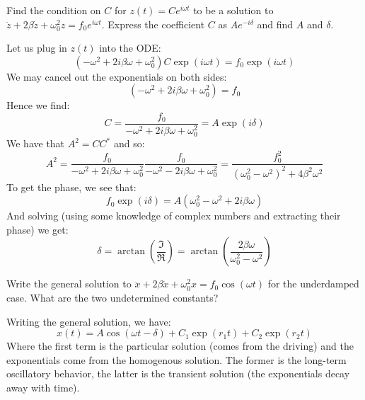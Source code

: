 \documentclass[../PHYS306Notes.tex]{subfiles}
\begin{document}
\begin{p}
Find the condition on $C$ for $z(t) = Ce^{i\omega t}$ to be a solution to $\ddot{z} + 2\beta\dot{z} + \omega_0^2z = f_0e^{i\omega t}$. Express the coefficient $C$ as $Ae^{-i\delta}$ and find $A$ and $\delta$.
\end{p}
\begin{s}
Let us plug in $z(t)$ into the ODE:
\[(-\omega^2 + 2i\beta\omega + \omega_0^2)C\exp(i\omega t) = f_0\exp(i\omega t)\]
We may cancel out the exponentials on both sides:
\[(-\omega^2 + 2i\beta\omega + \omega_0^2) =f_0\]
Hence we find:
\[C = \frac{f_0}{-\omega^2 + 2i\beta\omega + \omega_0^2} = A\exp(i\delta)\]
We have that $A^2 = CC^*$ and so:
\[A^2 = \frac{f_0}{-\omega^2 + 2i\beta\omega + \omega_0^2}\frac{f_0}{-\omega^2 - 2i\beta\omega + \omega_0^2} = \frac{f_0^2}{(\omega_0^2 - \omega^2)^2 + 4\beta^2\omega^2}\]
To get the phase, we see that:
\[f_0\exp(i\delta) = A(\omega_0^2 - \omega^2 + 2i\beta\omega)\]
And solving (using some knowledge of complex numbers and extracting their phase) we get:
\[\delta = \arctan(\frac{\Im}{\Re}) = \arctan(\frac{2\beta \omega}{\omega_0^2 - \omega^2})\]
\end{s}

\begin{p}
Write the general solution to $\ddot{x} + 2\beta\dot{x} + \omega_0^2x = f_0\cos(\omega t)$ for the underdamped case. What are the two undetermined constants?
\end{p}
\begin{s}
Writing the general solution, we have:
\[x(t) = A\cos(\omega t -\delta) + C_1\exp(r_1 t) + C_2\exp(r_2 t)\]
Where the first term is the particular solution (comes from the driving) and the exponentials come from the homogenous solution. The former is the long-term oscillatory behavior, the latter is the transient solution (the exponentials decay away with time).
\end{s}
\end{document}
